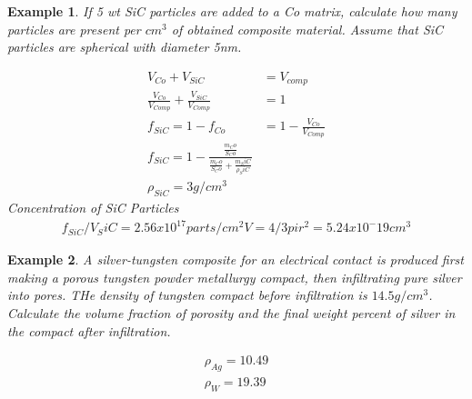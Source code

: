 \documentclass{article}
\newtheorem{theorem}{Example}
\begin{document}
\begin{theorem}
    If 5 wt SiC particles are added to a Co matrix, calculate how many particles are present per $cm^3$ of obtained composite material. Assume that SiC particles are spherical with diameter 5nm.

    \begin{equation*}
        \begin{aligned}
            V_{Co} + V_{SiC}                                   & = V_{comp}                    \\
            \frac{V_{Co}}{V_{Comp}} + \frac{V_{SiC}}{V_{Comp}} & = 1                           \\
            f_{SiC} = 1- f_{Co}                                & = 1 - \frac{V_{Co}}{V_{Comp}} \\
            f_{SiC} = 1 - \frac{\frac{m_Co}{S_Co}}{\frac{m_Co}{S_Co}+\frac{m_SiC}{\rho_SiC}}   \\
            \rho_{SiC} = 3 g/cm^3
        \end{aligned}
    \end{equation*}
    Concentration of SiC Particles
    \begin{equation*}
        \begin{aligned}
            f_{SiC}/ V_SiC = 2.56x10^17 parts/cm^2
            V= 4/3 pi r^2 = 5.24x10^-19cm^3
        \end{aligned}
    \end{equation*}

\end{theorem}
\begin{theorem}
    A silver-tungsten composite for an electrical contact is produced first making a porous tungsten powder metallurgy compact, then infiltrating pure silver into pores. THe density of tungsten compact before infiltration is $14.5 g/cm^3$. Calculate the volume fraction of porosity and the final weight percent of silver in the compact after infiltration.

    \begin{equation*}
        \begin{aligned}
            \rho_{Ag} = 10.49 \\
            \rho_{W} = 19.39
        \end{aligned}
    \end{equation*}
\end{theorem}
\end{document}
